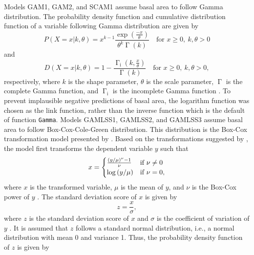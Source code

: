 Models GAM1, GAM2, and SCAM1 assume basal area to follow Gamma distribution.  The probability density function and cumulative distribution function of a variable following Gamma distribution are given by
\begin{equation}
  \label{eq:GammaDistributionPDF}
  P(X = x|k, \theta) = x^{k - 1} \frac{\exp{\left(\frac{-x}{\theta}\right)}}{\theta^k \upGamma(k)} \quad \text{for } x \geq 0, ~ k, \theta > 0
\end{equation}
and
\begin{equation}
  \label{eq:GammaDistributionCDF}
    D(X = x|k, \theta) = 1 - \frac{\upGamma_{\text{i}}\left(k, \frac{x}{\theta}\right)}{\upGamma(k)} \quad \text{for } x \geq 0, ~ k, \theta > 0,
\end{equation}
respectively, where \(k\) is the shape parameter, \(\theta\) is the scale parameter, \(\upGamma\) is the complete Gamma function, and \(\upGamma_{\text{i}}\) is the incomplete Gamma function \parencite{Weisstein2017b,Dormann2013,Lindgren1976}.  To prevent implausible negative predictions of basal area, the logarithm function was chosen as the link function, rather than the inverse function which is the default of function \texttt{Gamma}.  Models GAMLSS1, GAMLSS2, and GAMLSS3 assume basal area to follow Box-Cox-Cole-Green distribution. This distribution is the Box-Cox transformation model presented by \textcite{Cole1992} \parencite{Stasinopoulos2007}.  Based on the transformations suggested by \textcite{Box1964}, the model first transforms the dependent variable \(y\) such that
\begin{equation}
  \label{eq:BoxCoxColeGreenTransformation}
  x =
  \begin{cases}
    \frac{\left(
        y \middle/ \mu
      \right)^\nu - 1}{\nu} &\text{if } \nu \not = 0 \\
    \log\left(y \middle/ \mu\right) &\text{if } \nu = 0,
  \end{cases}
\end{equation}
where \(x\) is the transformed variable, \(\mu\) is the mean of \(y\), and \(\nu\) is the Box-Cox power of \(y\) \parencite{Cole1992}.
The standard deviation score of \(x\) is given by
\begin{equation}
  \label{eq:BoxCoxColeGreenSDScore}
  z = \frac{x}{\sigma},
\end{equation}
where \(z\) is the standard deviation score of \(x\) and \(\sigma\) is the coefficient of variation of \(y\) .  It is assumed that \(z\) follows a standard normal distribution, i.e., a normal distribution with mean 0 and variance 1. Thus, the probability density function of \(z\) is given by
